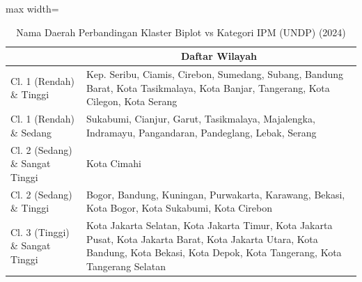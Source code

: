 \begin{table}[H]
\centering
\caption{Nama Daerah Perbandingan Klaster Biplot vs Kategori IPM (UNDP) (2024)} \label{tab:app1crossname2024}
\begin{adjustbox}{max width=\textwidth}
\begin{tabular}{|>{\centering\arraybackslash}p{4cm}|p{10cm}|}
\hline
\multicolumn{1}{|c|}{\textbf{Kategori}} & \multicolumn{1}{c|}{\textbf{Daftar Wilayah}} \\
\hline
Cl. 1 (Rendah) \& Tinggi & Kep. Seribu, Ciamis, Cirebon, Sumedang, Subang, Bandung Barat, Kota Tasikmalaya, Kota Banjar, Tangerang, Kota Cilegon, Kota Serang \\
\hline
Cl. 1 (Rendah) \& Sedang & Sukabumi, Cianjur, Garut, Tasikmalaya, Majalengka, Indramayu, Pangandaran, Pandeglang, Lebak, Serang \\
\hline
Cl. 2 (Sedang) \& Sangat Tinggi & Kota Cimahi \\
\hline
Cl. 2 (Sedang) \& Tinggi & Bogor, Bandung, Kuningan, Purwakarta, Karawang, Bekasi, Kota Bogor, Kota Sukabumi, Kota Cirebon \\
\hline
Cl. 3 (Tinggi) \& Sangat Tinggi & Kota Jakarta Selatan, Kota Jakarta Timur, Kota Jakarta Pusat, Kota Jakarta Barat, Kota Jakarta Utara, Kota Bandung, Kota Bekasi, Kota Depok, Kota Tangerang, Kota Tangerang Selatan \\
\hline
\end{tabular}
\end{adjustbox}
\end{table}